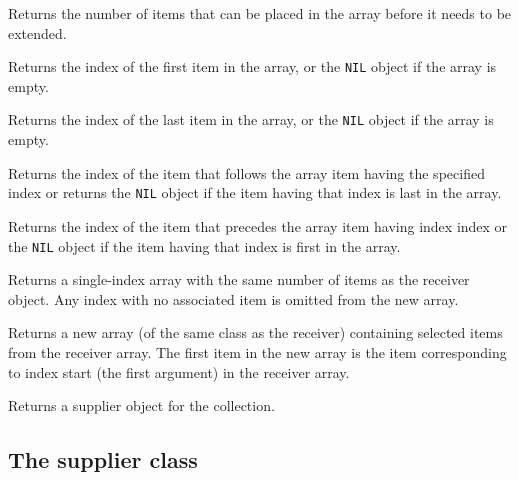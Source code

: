 

Returns the number of items that can be placed in the array before it
needs to be extended.



Returns the index of the first item in the array, or the \texttt{NIL}
object if the array is empty.



Returns the index of the last item in the array, or the \texttt{NIL}
object if the array is empty.



Returns the index of the item that follows the array item having the
specified index or returns the \texttt{NIL} object if the item having
that index is last in the array.



Returns the index of the item that precedes the array item having index
index or the \texttt{NIL} object if the item having that index is first
in the array.



Returns a single-index array with the same number of items as the
receiver object. Any index with no associated item is omitted from the
new array.

Returns a new array (of the same class as the receiver) containing
selected items from the receiver array. The first item in the new array
is the item corresponding to index start (the first argument) in the
receiver array.



Returns a supplier object for the collection.



\subsection{The supplier class}\label{the-supplier-class}

